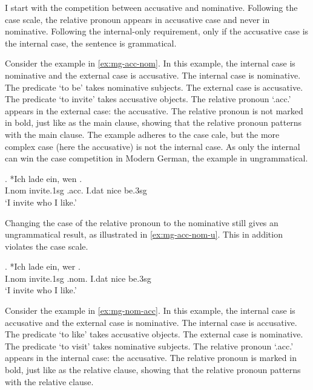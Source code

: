 I start with the competition between accusative and nominative. Following the case scale, the relative pronoun appears in accusative case and never in nominative. Following the internal-only requirement, only if the accusative case is the internal case, the sentence is grammatical.

Consider the example in \ref{ex:mg-acc-nom}. In this example, the internal case is nominative and the external case is accusative.
The internal case is nominative. The predicate  `to be' takes nominative subjects.
The external case is accusative. The predicate  `to invite' takes accusative objects.
The relative pronoun  `.\ac{acc}.' appears in the external case: the accusative. The relative pronoun is not marked in bold, just like as the main clause, showing that the relative pronoun patterns with the main clause.
The example adheres to the case cale, but the more complex case (here the accusative) is not the internal case. As only the internal can win the case competition in Modern German, the example in ungrammatical.

\exg. *Ich {lade ein}, wen   .\\
I.\ac{nom} invite.1\ac{sg}\scsub{[acc]} .\ac{acc}. I.\ac{dat} nice be.3\ac{sg}\scsub{[nom]}\\
`I invite who I like.' \label{ex:mg-acc-nom}

Changing the case of the relative pronoun to the nominative still gives an ungrammatical result, as illustrated in \ref{ex:mg-acc-nom-u}. This in addition violates the case scale.

\exg. *Ich {lade ein}, wer   .\\
I.\ac{nom} invite.1\ac{sg}\scsub{[acc]} .\ac{nom}. I.\ac{dat} nice be.3\ac{sg}\scsub{[nom]}\\
`I invite who I like.' \label{ex:mg-acc-nom-u}

Consider the example in \ref{ex:mg-nom-acc}. In this example, the internal case is accusative and the external case is nominative.
The internal case is accusative. The predicate  `to like' takes accusative objects.
The external case is nominative. The predicate  `to visit' takes nominative subjects.
The relative pronoun  `.\ac{acc}.' appears in the internal case: the accusative. The relative pronoun is marked in bold, just like as the relative clause, showing that the relative pronoun patterns with the relative clause.


